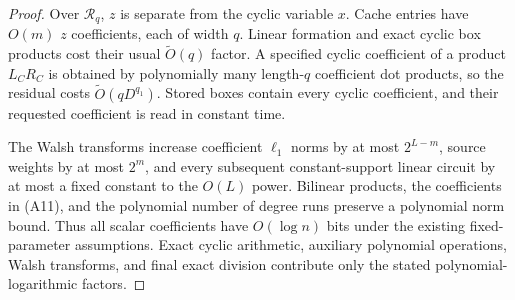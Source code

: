 \documentclass[11pt]{article}
\newcommand{\softO}{\widetilde O}
\begin{document}
\begin{proof}
Over $\mathcal R_q$, $z$ is separate from the cyclic variable $x$.
Cache entries have $O(m)$ $z$ coefficients, each of width $q$.
Linear formation and exact cyclic box products cost their usual
$\softO(q)$ factor. A specified cyclic coefficient of a product
$L_CR_C$ is obtained by polynomially many length-$q$ coefficient
dot products, so the residual costs $\softO(qD^{q_1})$.
Stored boxes contain every cyclic coefficient, and their requested
coefficient is read in constant time.

The Walsh transforms increase coefficient $\ell_1$ norms by at most
$2^{L-m}$, source weights by at most $2^m$, and every subsequent
constant-support linear circuit by at most a fixed constant to the
$O(L)$ power. Bilinear products, the coefficients in (A11), and the
polynomial number of degree runs preserve a polynomial norm bound.
Thus all scalar coefficients have $O(\log n)$ bits under the existing
fixed-parameter assumptions. Exact cyclic arithmetic, auxiliary
polynomial operations, Walsh transforms, and final exact division
contribute only the stated polynomial-logarithmic factors.
\end{proof}
\end{document}

